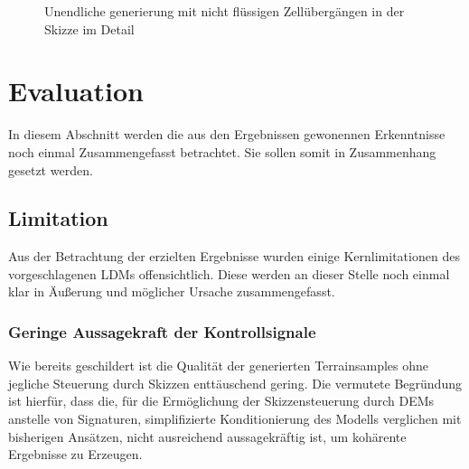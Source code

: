 \begin{figure}[htbp]
    \centering
    \caption{Unendliche generierung mit nicht flüssigen Zellübergängen in der Skizze im Detail}
    \label{fig:disconnected_render}
\end{figure}



\section{Evaluation}

In diesem Abschnitt werden die aus den Ergebnissen gewonennen Erkenntnisse noch einmal Zusammengefasst betrachtet. Sie sollen somit in Zusammenhang gesetzt werden.  

\subsection{Limitation}

Aus der Betrachtung der erzielten Ergebnisse wurden einige Kernlimitationen des vorgeschlagenen LDMs offensichtlich. Diese werden an dieser Stelle noch einmal klar in Äußerung und möglicher Ursache zusammengefasst.

\subsubsection{Geringe Aussagekraft der Kontrollsignale}

Wie bereits geschildert ist die Qualität der generierten Terrainsamples ohne jegliche Steuerung durch Skizzen enttäuschend gering. Die vermutete Begründung ist hierfür, dass die, für die Ermöglichung der Skizzensteuerung durch DEMs anstelle von Signaturen, simplifizierte Konditionierung des Modells verglichen mit bisherigen Ansätzen, nicht ausreichend aussagekräftig ist, um kohärente Ergebnisse zu Erzeugen. 

